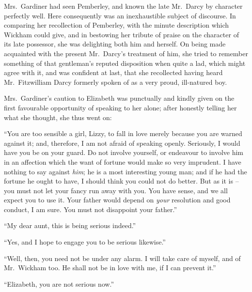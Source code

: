 Mrs.\ Gardiner had seen Pemberley, and known the late
Mr.\ Darcy by character perfectly well. Here consequently
was an inexhaustible subject of discourse. In comparing
her recollection of Pemberley, with the minute description
which Wickham could give, and in bestowing her tribute
of praise on the character of its late possessor, she was
delighting both him and herself. On being made acquainted
with the present Mr.\ Darcy’s treatment of him, she tried
to remember something of that gentleman’s reputed disposition
when quite a lad, which might agree with it, and
was confident at last, that she recollected having heard
Mr.\ Fitzwilliam Darcy formerly spoken of as a very proud,
ill-natured boy.


Mrs.\ Gardiner’s caution to Elizabeth was punctually
and kindly given on the first favourable opportunity of
speaking to her alone; after honestly telling her what
she thought, she thus went on:

“You are too sensible a girl, Lizzy, to fall in love
merely because you are warned against it; and, therefore,
I am not afraid of speaking openly. Seriously, I would
have you be on your guard. Do not involve yourself,
or endeavour to involve him in an affection which the
want of fortune would make so very imprudent. I have
nothing to say against \textit{him}; he is a most interesting
young man; and if he had the fortune he ought to have,
I should think you could not do better. But as it is -- you
must not let your fancy run away with you. You have
sense, and we all expect you to use it. Your father would
depend on \textit{your} resolution and good conduct, I am sure.
You must not disappoint your father.”

“My dear aunt, this is being serious indeed.”

“Yes, and I hope to engage you to be serious
likewise.”

“Well, then, you need not be under any alarm. I will
take care of myself, and of Mr.\ Wickham too. He shall
not be in love with me, if I can prevent it.”

“Elizabeth, you are not serious now.”

